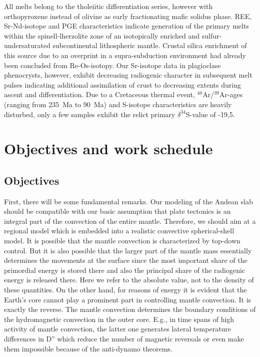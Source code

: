 \documentclass[twoside,10pt]{article}
\begin{document}
All melts belong to the tholeiitic differentiation series, however with orthopyroxene instead of olivine as early fractionating mafic solidus phase. 
REE, Sr-Nd-isotope and PGE characteristics indicate generation of the primary melts within the spinell-lherzolite zone of an isotopically enriched and sulfur-undersaturated subcontinental lithospheric mantle. 
Crustal silica enrichment of this source due to an overprint in a supra-subduction environment had already been concluded from Re-Os-isotopy. 
Our Sr-isotope data in plagioclase phenocrysts, however, exhibit decreasing radio\-genic character in subsequent melt pulses indicating additional assimilation of crust to decreasing extents during ascent and differentiation.
Due to a Cretaceous thermal event, $^{40}$Ar/$^{39}$Ar-ages (ranging from 235~Ma to 90~Ma) and S-isotope characteristics are heavily disturbed, only a few samples exhibit the relict primary \mbox{$\delta^{34}$S-value} of -19,5.

%
%

\section{Objectives and work schedule}\label{sec:3}
\subsection{Objectives}
First, there will be some fundamental remarks. Our modeling of the Andean slab should be compatible with our basic assumption that plate tectonics is an integral part of the convection of the entire mantle.
Therefore, we should aim at a regional model which is embedded into a realistic convective spherical-shell model. 
It is possible that the mantle convection is characterized by top-down control. 
But it is also possible that the larger part of the mantle mass essentially determines the movements at the surface since the most important share of the primordial energy is stored there and also the principal share of the radiogenic energy is released there.
Here we refer to the absolute value, not to the density of these quantities. 
On the other hand, for reasons of energy it is evident that the Earth's core cannot play a prominent part in controlling mantle convection.
It is exactly the reverse. 
The mantle convection determines the boundary conditions of the hydromagnetic convection in the outer core.
E.g., in time spans of high activity of mantle convection, the latter one generates lateral temperature differences in D'' which reduce the number of magnetic reversals or even make them impossible because of the anti-dynamo theorems.
\end{document}
